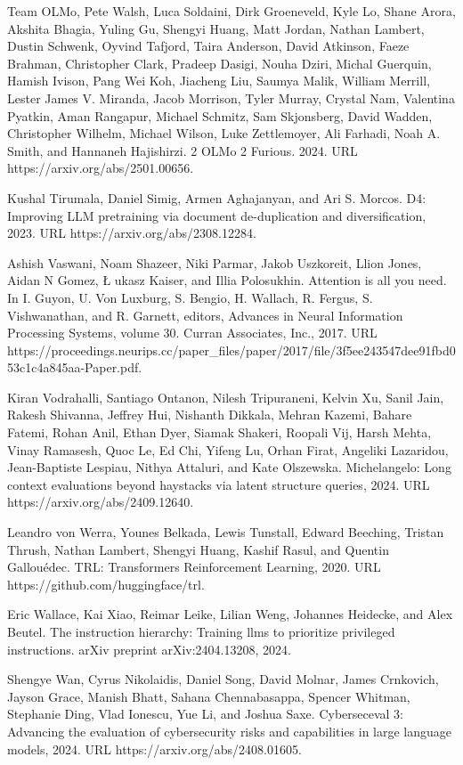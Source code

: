 Team OLMo, Pete Walsh, Luca Soldaini, Dirk Groeneveld, Kyle Lo, Shane
Arora, Akshita Bhagia, Yuling Gu, Shengyi Huang, Matt Jordan, Nathan
Lambert, Dustin Schwenk, Oyvind Tafjord, Taira Anderson, David Atkinson,
Faeze Brahman, Christopher Clark, Pradeep Dasigi, Nouha Dziri, Michal
Guerquin, Hamish Ivison, Pang Wei Koh, Jiacheng Liu, Saumya Malik,
William Merrill, Lester James V. Miranda, Jacob Morrison, Tyler Murray,
Crystal Nam, Valentina Pyatkin, Aman Rangapur, Michael Schmitz, Sam
Skjonsberg, David Wadden, Christopher Wilhelm, Michael Wilson, Luke
Zettlemoyer, Ali Farhadi, Noah A. Smith, and Hannaneh Hajishirzi. 2 OLMo
2 Furious. 2024. URL https://arxiv.org/abs/2501.00656.

Kushal Tirumala, Daniel Simig, Armen Aghajanyan, and Ari S. Morcos. D4:
Improving LLM pretraining via document de-duplication and
diversification, 2023. URL https://arxiv.org/abs/2308.12284.

Ashish Vaswani, Noam Shazeer, Niki Parmar, Jakob Uszkoreit, Llion Jones,
Aidan N Gomez, Ł ukasz Kaiser, and Illia Polosukhin. Attention is all
you need. In I. Guyon, U. Von Luxburg, S. Bengio, H. Wallach, R. Fergus,
S. Vishwanathan, and R. Garnett, editors, Advances in Neural Information
Processing Systems, volume 30. Curran Associates, Inc., 2017. URL
https://proceedings.neurips.cc/paper\_files/paper/2017/file/3f5ee243547dee91fbd053c1c4a845aa-Paper.pdf.

Kiran Vodrahalli, Santiago Ontanon, Nilesh Tripuraneni, Kelvin Xu, Sanil
Jain, Rakesh Shivanna, Jeffrey Hui, Nishanth Dikkala, Mehran Kazemi,
Bahare Fatemi, Rohan Anil, Ethan Dyer, Siamak Shakeri, Roopali Vij,
Harsh Mehta, Vinay Ramasesh, Quoc Le, Ed Chi, Yifeng Lu, Orhan Firat,
Angeliki Lazaridou, Jean-Baptiste Lespiau, Nithya Attaluri, and Kate
Olszewska. Michelangelo: Long context evaluations beyond haystacks via
latent structure queries, 2024. URL https://arxiv.org/abs/2409.12640.

Leandro von Werra, Younes Belkada, Lewis Tunstall, Edward Beeching,
Tristan Thrush, Nathan Lambert, Shengyi Huang, Kashif Rasul, and Quentin
Gallouédec. TRL: Transformers Reinforcement Learning, 2020. URL
https://github.com/huggingface/trl.

Eric Wallace, Kai Xiao, Reimar Leike, Lilian Weng, Johannes Heidecke,
and Alex Beutel. The instruction hierarchy: Training llms to prioritize
privileged instructions. arXiv preprint arXiv:2404.13208, 2024.

Shengye Wan, Cyrus Nikolaidis, Daniel Song, David Molnar, James
Crnkovich, Jayson Grace, Manish Bhatt, Sahana Chennabasappa, Spencer
Whitman, Stephanie Ding, Vlad Ionescu, Yue Li, and Joshua Saxe.
Cyberseceval 3: Advancing the evaluation of cybersecurity risks and
capabilities in large language models, 2024. URL
https://arxiv.org/abs/2408.01605.

